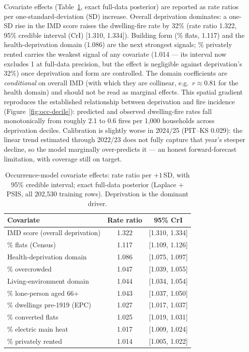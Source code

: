 Covariate effects (Table~\ref{tab:occ-forest}, exact full-data posterior) are
reported as rate ratios per one-standard-deviation (SD) increase. Overall
deprivation dominates: a one-SD rise in the IMD score raises the dwelling-fire
rate by 32\% (rate ratio 1.322, 95\% credible interval (CrI) [1.310, 1.334]).
Building form (\% flats, 1.117) and
the health-deprivation domain (1.086) are the next strongest signals; \% privately
rented carries the weakest signal of any covariate (1.014 --- its interval now
excludes 1 at full-data precision, but the effect is negligible against
deprivation's 32\%) once deprivation and form are controlled. The domain coefficients are \emph{conditional} on overall IMD
(with which they are collinear, e.g.\ $r\approx0.81$ for the health domain) and
should not be read as marginal effects. This spatial gradient reproduces the
established relationship between deprivation and fire incidence
(Figure~\ref{fig:occ-decile}): predicted and observed dwelling-fire rates fall
monotonically from roughly 2.1 to 0.6 fires per 1{,}000 households across
deprivation deciles. Calibration is slightly worse in 2024/25 (PIT--KS 0.029):
the linear trend estimated through 2022/23 does not fully capture that year's
steeper decline, so the model marginally over-predicts it --- an honest
forward-forecast limitation, with coverage still on target.

\begin{table}[htbp]
  \centering
  \caption{Occurrence-model covariate effects: rate ratio per $+1$\,SD, with
  95\% credible interval; exact full-data posterior (Laplace + PSIS, all
  202{,}530 training rows). Deprivation is the dominant driver.}
  \label{tab:occ-forest}
  \small
  \begin{tabular}{@{}lcc@{}}
    \toprule
    Covariate & Rate ratio & 95\% CrI \\
    \midrule
    IMD score (overall deprivation) & 1.322 & [1.310, 1.334] \\
    \% flats (Census)               & 1.117 & [1.109, 1.126] \\
    Health-deprivation domain       & 1.086 & [1.075, 1.097] \\
    \% overcrowded                  & 1.047 & [1.039, 1.055] \\
    Living-environment domain       & 1.044 & [1.034, 1.054] \\
    \% lone-person aged 66+         & 1.043 & [1.037, 1.050] \\
    \% dwellings pre-1919 (EPC)     & 1.027 & [1.017, 1.037] \\
    \% converted flats              & 1.025 & [1.019, 1.031] \\
    \% electric main heat           & 1.017 & [1.009, 1.024] \\
    \% privately rented             & 1.014 & [1.005, 1.022] \\
    \bottomrule
  \end{tabular}
\end{table}

